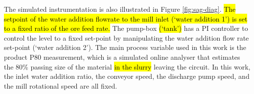 {The simulated instrumentation is also illustrated in Figure \ref{fig:sag-diag}. \hl{The setpoint of the water addition flowrate to the mill inlet (`water addition 1') is set to a fixed ratio of the ore feed rate.} The pump-box \hl{(`tank')} has a \gls{PI} controller to control the level to a fixed set-point by manipulating the water addition flow rate set-point (`water addition 2'). The main process variable used in this work is the product P80 measurement, which is a simulated online analyser that estimates the 80\% passing size of the material \hl{in the slurry} leaving the circuit. In this work, the inlet water addition ratio, the conveyor speed, the discharge pump speed, and the mill rotational speed are all fixed.

%
%
}
